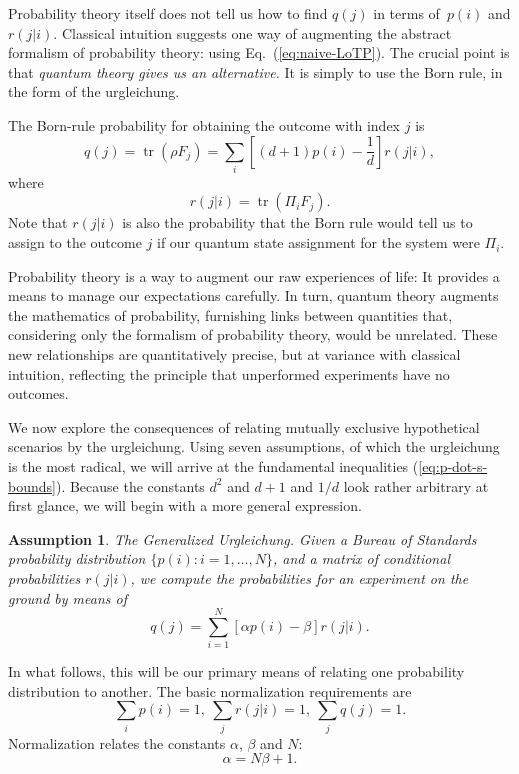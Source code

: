 \documentclass[aps,pra,superscriptaddress,10pt,tightenlines,twocolumn,nofootinbib]{revtex4}
\newtheorem{assump}{Assumption}
\theoremstyle{remark}
\DeclareMathOperator{\Tr}{tr}
\begin{document}
Probability theory itself does not tell us how to find $q(j)$ in terms
of~$p(i)$ and $r(j|i)$.  Classical intuition suggests one way of
augmenting the abstract formalism of probability theory:  using
Eq.~(\ref{eq:naive-LoTP}).  The crucial point is that \emph{quantum
  theory gives us an alternative.}  It is simply to use the Born rule,
in the form of the urgleichung.

The Born-rule probability for obtaining the outcome with
index $j$ is
\begin{equation}
q(j) = \Tr(\rho F_j) = \sum_i \left[(d+1) p(i) - \frac{1}{d}\right]
r(j|i),
\end{equation}
where
\begin{equation}
r(j|i) = \Tr (\Pi_i F_j).
\end{equation}
Note that $r(j|i)$ is also the probability that the Born rule would
tell us to assign to the outcome $j$ if our quantum state assignment
for the system were $\Pi_i$.

Probability theory is a way to augment our raw experiences of life:
It provides a means to manage our expectations carefully.  In turn,
quantum theory augments the mathematics of probability, furnishing
links between quantities that, considering only the formalism of
probability theory, would be unrelated.  These new relationships are
quantitatively precise, but at variance with classical intuition,
reflecting the principle that unperformed experiments have no outcomes.

We now explore the consequences of relating mutually exclusive
hypothetical scenarios by the urgleichung.  Using seven assumptions, of
which the urgleichung is the most radical, we will arrive at the
fundamental inequalities (\ref{eq:p-dot-s-bounds}).  Because the
constants $d^2$ and $d+1$ and $1/d$ look rather arbitrary at first
glance, we will begin with a more general expression.

\begin{assump}
\label{assump:urgleichung}
The Generalized Urgleichung.  Given a Bureau of Standards probability
distribution $\{p(i): i = 1,\ldots,N\}$, and a matrix of conditional
probabilities $r(j|i)$, we compute the probabilities for an experiment
on the ground by means of
\begin{equation}
q(j) = \sum_{i=1}^N \left[\alpha p(i) - \beta\right] r(j|i).
\label{eq:gen-urgleichung}
\end{equation}
\end{assump}
In what follows, this will be our primary means of relating one
probability distribution to another.  The basic normalization
requirements are
\begin{equation}
\sum_i p(i) = 1,\ \sum_j r(j|i) = 1,\ \sum_j q(j) = 1.
\end{equation}
Normalization relates the constants $\alpha$, $\beta$ and $N$:
\begin{equation}
\alpha = N\beta + 1.
\end{equation}
\end{document}

